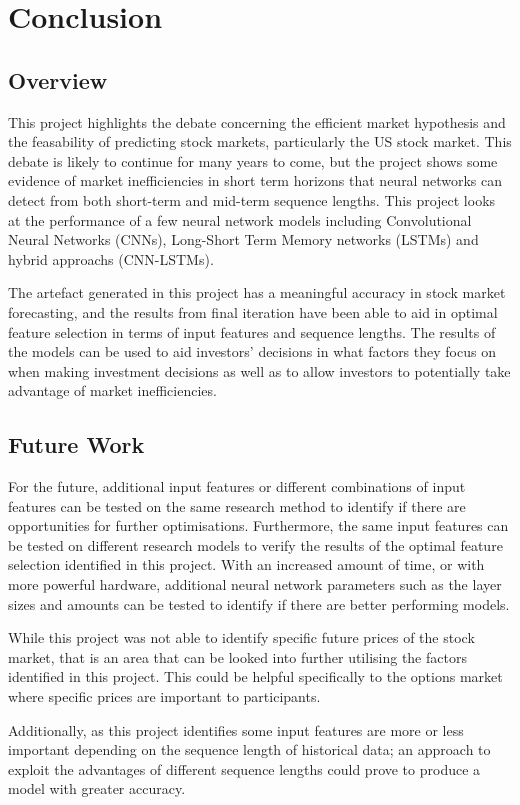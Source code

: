\chapter{Conclusion} \label{chap:conclusion}
\section{Overview}
This project highlights the debate concerning the efficient market hypothesis and the feasability
of predicting stock markets, particularly the US stock market. This debate is likely to continue 
for many years to come, but the project shows some evidence of market inefficiencies in short term
horizons that neural networks can detect from both short-term and mid-term sequence lengths.
This project looks at the performance of a few neural network models including Convolutional Neural
Networks (CNNs), Long-Short Term Memory networks (LSTMs) and hybrid approachs (CNN-LSTMs).

The artefact generated in this project has a meaningful accuracy in stock market forecasting,
and the results from final iteration have been able to aid in optimal feature selection in terms
of input features and sequence lengths. The results of the models can be used to aid investors'
decisions in what factors they focus on when making investment decisions as well as to allow
investors to potentially take advantage of market inefficiencies.

\section{Future Work}
For the future, additional input features or different combinations of input features can be tested
on the same research method to identify if there are opportunities for further optimisations.
Furthermore, the same input features can be tested on different research models to verify the results
of the optimal feature selection identified in this project. With an increased amount of time, or with
more powerful hardware, additional neural network parameters such as the layer sizes and amounts can be
tested to identify if there are better performing models.

While this project was not able to identify specific future prices of the stock market, that is an
area that can be looked into further utilising the factors identified in this project. This could be
helpful specifically to the options market where specific prices are important to participants.

Additionally, as this project identifies some input features are more or less important depending on
the sequence length of historical data; an approach to exploit the advantages of different
sequence lengths could prove to produce a model with greater accuracy.
